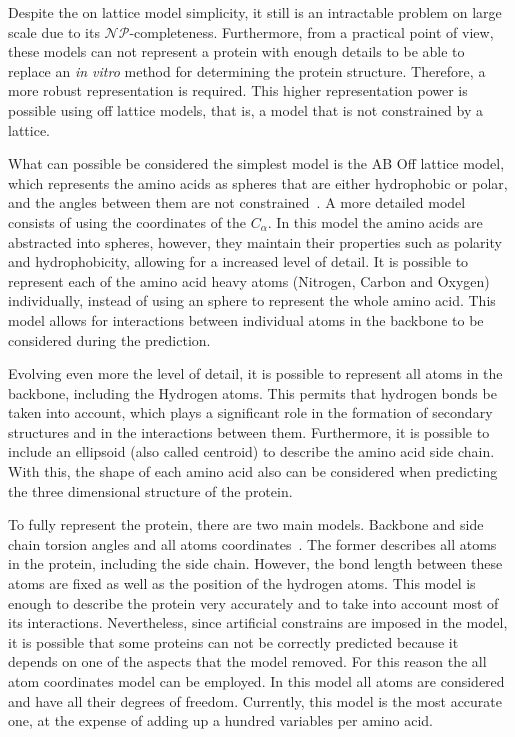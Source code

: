 Despite the on lattice model simplicity, it still is an intractable problem on
large scale due to its $\mathcal{NP}$-completeness. Furthermore, from a
practical point of view, these models can not represent a protein with enough
details to be able to replace an \textit{in vitro} method for determining the
protein structure. Therefore, a more robust representation is required. This
higher representation power is possible using off lattice models, that is, a
model that is not constrained by a lattice.

What can possible be considered the simplest model is the AB Off lattice model,
which represents the amino acids as spheres that are either hydrophobic or
polar, and the angles between them are not
constrained~\cite{berger1998protein}.  A more detailed model consists of using
the coordinates of the $C_\alpha$. In this model the amino acids are abstracted
into spheres, however, they maintain their properties such as polarity and
hydrophobicity, allowing for a increased level of detail. It is possible to
represent each of the amino acid heavy atoms (Nitrogen, Carbon and Oxygen)
individually, instead of using an sphere to represent the whole amino acid.
This model allows for interactions between individual atoms in the  backbone to
be considered during the prediction.

Evolving even more the level of detail, it is possible to represent all atoms
in the backbone, including the Hydrogen atoms. This permits that hydrogen bonds
be taken into account, which plays a significant role in the formation of
secondary structures and in the interactions between them. Furthermore, it is
possible to include an ellipsoid (also called centroid) to describe the amino
acid side chain. With this, the shape of each amino acid also can be considered
when predicting the three dimensional structure of the protein.

To fully represent the protein, there are two main models. Backbone and side
chain torsion angles and all atoms coordinates~\cite{rohl2004protein}.  The
former describes all atoms in the protein, including the side chain. However,
the bond length between these atoms are fixed as well as the position of the
hydrogen atoms. This model is enough to describe the protein very accurately
and to take into account most of its interactions. Nevertheless, since
artificial constrains are imposed in the model, it is possible that some
proteins can not be correctly predicted because it depends on one of the
aspects that the model removed. For this reason the all atom coordinates model
can be employed. In this model all atoms are considered and have all their
degrees of freedom. Currently, this model is the most accurate one, at the
expense of adding up a hundred variables per amino acid.

